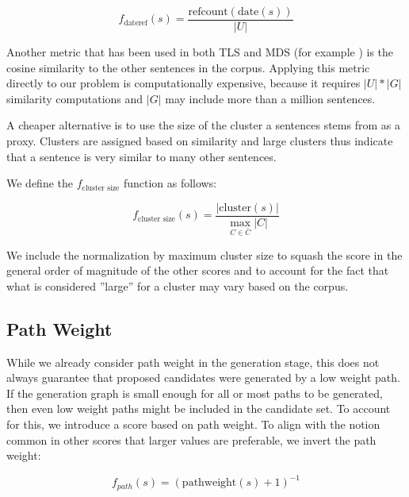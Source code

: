 \documentclass[a4paper,BCOR=10mm]{report}
\begin{document}
\begin{displaymath}
f_{\text{dateref}}(s) = \frac{\text{refcount}(\text{date}(s))}{|U|}
\end{displaymath}

Another metric that has been used in both TLS \citep{chieu} and MDS (for example \citet{lexrank}) is the cosine similarity to the other sentences in the corpus.
Applying this metric directly to our problem is computationally expensive, because it requires $|U| * |G|$ similarity computations and $|G|$ may include more than a million sentences.

A cheaper alternative is to use the size of the cluster a sentences stems from as a proxy. Clusters are assigned based on similarity and large clusters thus indicate that a sentence is very similar to many other sentences.

We define the $f_{\text{cluster size}}$ function as follows:

\begin{displaymath}
f_{\text{cluster size}}(s) = \frac{|\text{cluster}(s)|}{\max_{C \in \bar{C}}{|C|}}
\end{displaymath}

We include the normalization by maximum cluster size to squash the score in the general order of magnitude of the other scores and to account for the fact that what is considered ''large'' for a cluster may vary based on the corpus.


\subsection{Path Weight}

While we already consider path weight in the generation stage, this does not always guarantee that proposed candidates were generated by a low weight path. If the generation graph is small enough for all or most paths to be generated, then even low weight paths might be included in the candidate set.
To account for this, we introduce a score based on path weight. To align with the notion common in other scores that larger values are preferable, we invert the path weight:

\begin{displaymath}
f_{path}(s) = (\text{pathweight}(s) + 1)^{-1}
\end{displaymath}
\end{document}
